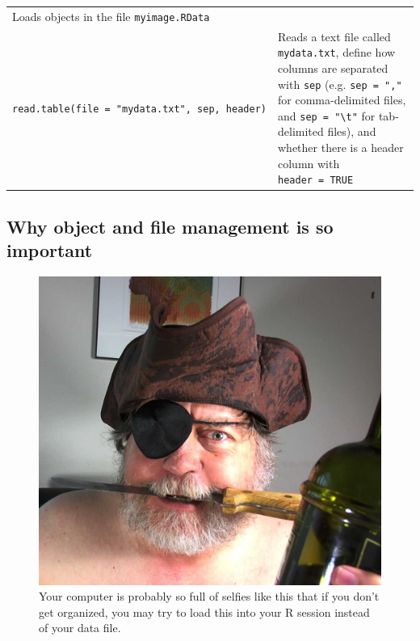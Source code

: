 \documentclass[]{book}
\theoremstyle{definition}
\theoremstyle{definition}
\theoremstyle{remark}
\begin{document}
\begin{longtable}[]{@{}ll@{}}
\begin{minipage}[t]{0.47\columnwidth}
Loads objects in the file \texttt{myimage.RData}\strut
\end{minipage}\tabularnewline
\begin{minipage}[t]{0.34\columnwidth}\raggedright\strut
\texttt{read.table(file\ =\ "mydata.txt",\ sep,\ header)}\strut
\end{minipage} & \begin{minipage}[t]{0.47\columnwidth}\raggedright\strut
Reads a text file called \texttt{mydata.txt}, define how columns are
separated with \texttt{sep} (e.g. \texttt{sep\ =\ ","} for
comma-delimited files, and \texttt{sep\ =\ "\textbackslash{}t"} for
tab-delimited files), and whether there is a header column with
\texttt{header\ =\ TRUE}\strut
\end{minipage}\tabularnewline
\bottomrule
\end{longtable}

\subsection{Why object and file management is so
important}\label{why-object-and-file-management-is-so-important}

\begin{figure}

{\centering \includegraphics[width=0.5\linewidth]{images/pirateselfie} 

}

\caption{Your computer is probably so full of selfies like this that if you don't get organized, you may try to load this into your R session instead of your data file.}\label{fig:selfie}
\end{figure}
\end{document}
